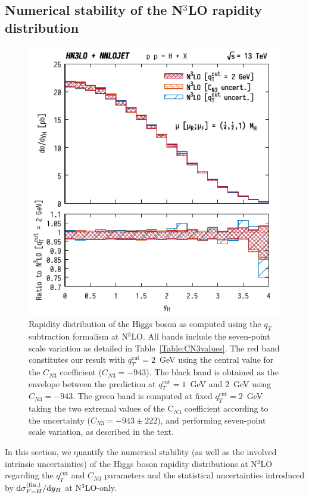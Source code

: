 \documentclass[12pt]{article}
\DeclareRobustCommand{\qt}{q_T}
\DeclareRobustCommand{\qtcut}{\ensuremath{q_T^\mathrm{cut}}}
\DeclareRobustCommand{\rd}{\ensuremath{\mathrm{d}}}
\begin{document}
\subsection{Numerical stability of the N$^\text{3}$LO rapidity distribution}
\label{sec:N3LOrap}
\begin{figure}[tbh]
\centering
\includegraphics[width=.6\linewidth]{./new_figures/yH_B02_only_N3LO_qTcut_uncert_CN3_uncert}
\caption{\label{fig:yHN3LOonly}{Rapidity distribution of the Higgs boson as computed using the $\qt$ subtraction formalism at N$^{3}$LO. All bands include the seven-point scale variation as detailed in Table~\ref{Table:CN3values}. The red band constitutes our result with $\qtcut=2$~GeV using the central value for the $C_{N3}$ coefficient ($C_{N3}=-943$). The black band is obtained as the envelope between the prediction at $\qtcut=1$~GeV and $2$~GeV using $C_{N3}=-943$. The green band is computed at fixed $\qtcut=2$~GeV  taking the two extremal values of the C$_{N3}$ coefficient according to the uncertainty ($C_{N3}=-943 \pm 222$), and performing seven-point scale variation,  as described in the text.
}}
\end{figure}
In this section, we quantify the numerical stability (as well as the involved intrinsic uncertainties) of the Higgs boson rapidity distributions at N$^3$LO regarding the $\qtcut$ and $C_{N3}$ parameters and the statistical uncertainties introduced by $\rd\sigma_{F=H}^{(\rm fin.)}/\rd y_H$ at N$^3$LO-only.
\end{document}
